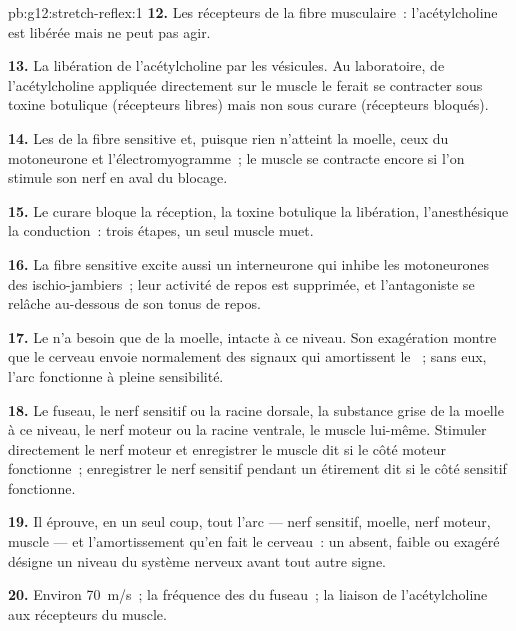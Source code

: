\begin{solution}{pb:g12:stretch-reflex:1}
\textbf{12.} Les récepteurs de la fibre musculaire~: l'acétylcholine
est libérée mais ne peut pas agir.

\textbf{13.} La libération de l'acétylcholine par les vésicules. Au
laboratoire, de l'acétylcholine appliquée directement sur le muscle le
ferait se contracter sous toxine botulique (récepteurs libres) mais
non sous curare (récepteurs bloqués).

\textbf{14.} Les  de la fibre sensitive et, puisque
rien n'atteint la moelle, ceux du motoneurone et l'électromyogramme~;
le muscle se contracte encore si l'on stimule son nerf en aval du
blocage.

\textbf{15.} Le curare bloque la réception, la toxine botulique la
libération, l'anesthésique la conduction~: trois étapes, un seul
muscle muet.

\textbf{16.} La fibre sensitive excite aussi un interneurone qui
inhibe les motoneurones des ischio-jambiers~; leur activité de repos
est supprimée, et l'antagoniste se relâche au-dessous de son tonus de
repos.

\textbf{17.} Le  n'a besoin que de la moelle, intacte à ce
niveau. Son exagération montre que le cerveau envoie normalement des
signaux qui amortissent le ~; sans eux, l'arc fonctionne à
pleine sensibilité.

\textbf{18.} Le fuseau, le nerf sensitif ou la racine dorsale, la
substance grise de la moelle à ce niveau, le nerf moteur ou la racine
ventrale, le muscle lui-même. Stimuler directement le nerf moteur et
enregistrer le muscle dit si le côté moteur fonctionne~; enregistrer
le nerf sensitif pendant un étirement dit si le côté sensitif
fonctionne.

\textbf{19.} Il éprouve, en un seul coup, tout l'arc --- nerf
sensitif, moelle, nerf moteur, muscle --- et l'amortissement qu'en
fait le cerveau~: un  absent, faible ou exagéré désigne un
niveau du système nerveux avant tout autre signe.

\textbf{20.} Environ \qty{70}{m/s}~; la fréquence des  du fuseau~; la liaison de l'acétylcholine aux récepteurs du
muscle.
\end{solution}
